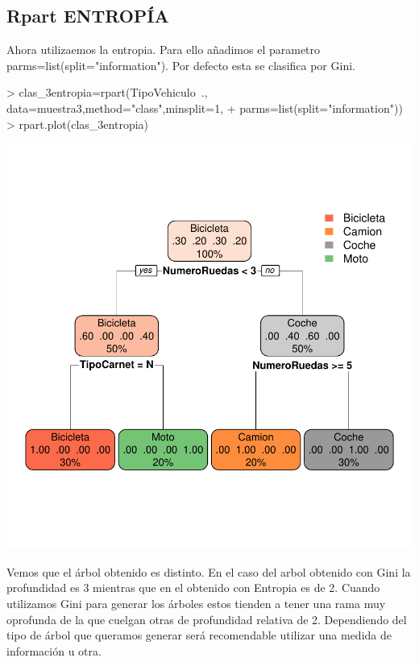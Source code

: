 \documentclass [a4paper] {article}
\begin{document}
\subsection{Rpart ENTROPÍA}
Ahora utilizaemos la entropia. 
Para ello añadimos el parametro parms=list(split="information").
Por defecto esta se clasifica por Gini.
\begin{center}
\begin{Schunk}
\begin{Sinput}
> clas_3entropia=rpart(TipoVehiculo~., data=muestra3,method="class",minsplit=1,
+                       parms=list(split="information"))
> rpart.plot(clas_3entropia)
\end{Sinput}
\end{Schunk}
\includegraphics{entrega-rpart3_entropia}
\end{center}

Vemos que el árbol obtenido es distinto.
En el caso del arbol obtenido con Gini la profundidad es 3 mientras que en el obtenido con Entropia es de 2.
Cuando utilizamos Gini para generar los árboles estos tienden a tener una rama muy oprofunda de la que cuelgan otras de profundidad relativa de 2.
Dependiendo del tipo de árbol que queramos generar será recomendable utilizar una medida de información u otra.

\newpage
\end{document}
